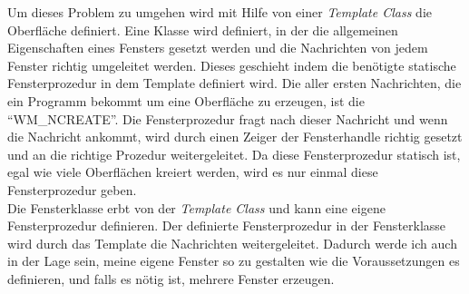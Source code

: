 Um dieses Problem zu umgehen wird mit Hilfe von einer \textit{Template Class} die Oberfläche definiert. Eine Klasse wird definiert, in der die allgemeinen Eigenschaften eines Fensters gesetzt werden und die Nachrichten von jedem Fenster richtig umgeleitet werden. Dieses geschieht indem die benötigte statische Fensterprozedur in dem Template definiert wird. Die aller ersten Nachrichten, die ein Programm bekommt um eine Oberfläche zu erzeugen, ist die "`WM\_NCREATE"'. Die Fensterprozedur fragt nach dieser Nachricht und wenn die Nachricht ankommt, wird durch einen Zeiger der Fensterhandle richtig gesetzt und an die richtige Prozedur weitergeleitet. Da diese Fensterprozedur statisch ist, egal wie viele Oberflächen kreiert werden, wird es nur einmal diese Fensterprozedur geben.\\


Die Fensterklasse erbt von der \textit{Template Class} und kann eine eigene Fensterprozedur definieren. Der definierte Fensterprozedur in der Fensterklasse wird durch das Template die Nachrichten weitergeleitet. Dadurch werde ich auch in der Lage sein, meine eigene Fenster so zu gestalten wie die Voraussetzungen es definieren, und falls es nötig ist, mehrere Fenster erzeugen.